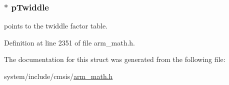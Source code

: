 \subsubsection[{\texorpdfstring{p\+Twiddle}{pTwiddle}}]{$\ast$ p\+Twiddle}\hypertarget{structarm__dct4__instance__q15_aa8c837c05b2c910342ab8f171d30dc02}{}\label{structarm__dct4__instance__q15_aa8c837c05b2c910342ab8f171d30dc02}
points to the twiddle factor table. 

Definition at line 2351 of file arm\+\_\+math.\+h.



The documentation for this struct was generated from the following file\+:\begin{DoxyCompactItemize}
\item 
system/include/cmsis/\hyperlink{arm__math_8h}{arm\+\_\+math.\+h}\end{DoxyCompactItemize}

